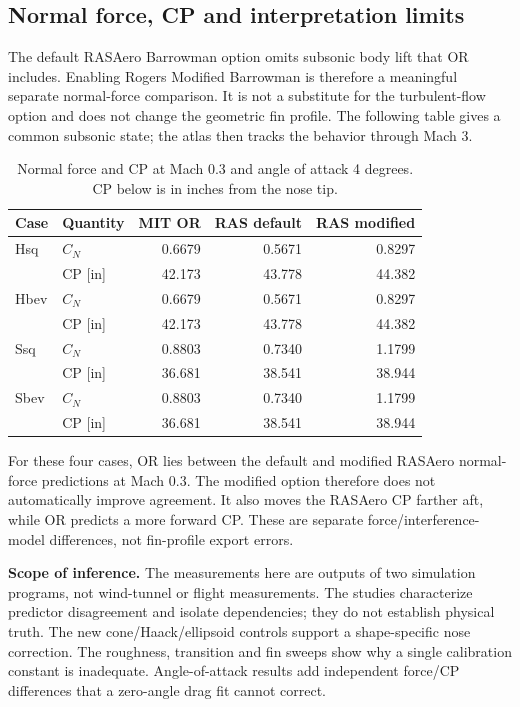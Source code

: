 \documentclass[oneside,openany]{amsdtx}
\begin{document}
\clearpage\subsection{Normal force, CP and interpretation limits}
The default RASAero Barrowman option omits subsonic body lift that OR includes. Enabling Rogers Modified Barrowman is therefore a meaningful separate normal-force comparison. It is not a substitute for the turbulent-flow option and does not change the geometric fin profile. The following table gives a common subsonic state; the atlas then tracks the behavior through Mach 3.
\begin{table}[H]\centering\small\renewcommand{\arraystretch}{1.12}
\caption{Normal force and CP at Mach 0.3 and angle of attack 4 degrees. CP below is in inches from the nose tip.}
\begin{tabular}{@{}llrrr@{}}\toprule
Case & Quantity & MIT OR & RAS default & RAS modified\\\midrule


Hsq & $C_N$ & 0.6679 & 0.5671 & 0.8297\\

 & CP [in] & 42.173 & 43.778 & 44.382\\

Hbev & $C_N$ & 0.6679 & 0.5671 & 0.8297\\

 & CP [in] & 42.173 & 43.778 & 44.382\\

Ssq & $C_N$ & 0.8803 & 0.7340 & 1.1799\\

 & CP [in] & 36.681 & 38.541 & 38.944\\

Sbev & $C_N$ & 0.8803 & 0.7340 & 1.1799\\

 & CP [in] & 36.681 & 38.541 & 38.944\\


\bottomrule\end{tabular}\end{table}
For these four cases, OR lies between the default and modified RASAero normal-force predictions at Mach 0.3. The modified option therefore does not automatically improve agreement. It also moves the RASAero CP farther aft, while OR predicts a more forward CP. These are separate force/interference-model differences, not fin-profile export errors.

\textbf{Scope of inference.} The measurements here are outputs of two simulation programs, not wind-tunnel or flight measurements. The studies characterize predictor disagreement and isolate dependencies; they do not establish physical truth. The new cone/Haack/ellipsoid controls support a shape-specific nose correction. The roughness, transition and fin sweeps show why a single calibration constant is inadequate. Angle-of-attack results add independent force/CP differences that a zero-angle drag fit cannot correct.
\end{document}
